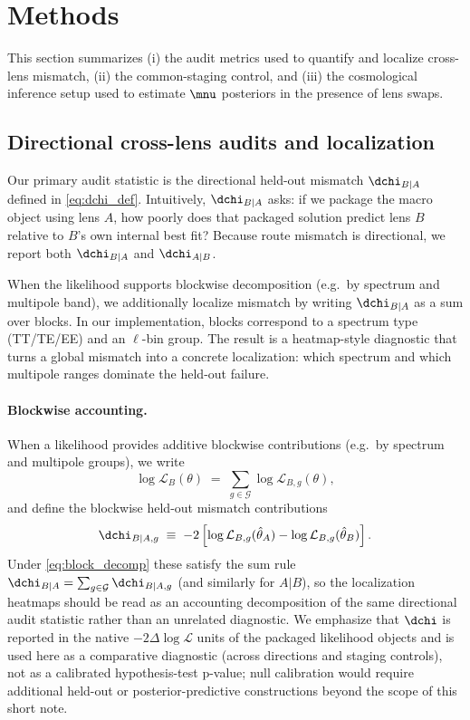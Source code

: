 \section{Methods}
\label{sec:methods}

This section summarizes (i) the audit metrics used to quantify and localize cross-lens mismatch, (ii) the common-staging control, and (iii) the cosmological inference setup used to estimate $\mnu$ posteriors in the presence of lens swaps.

\subsection{Directional cross-lens audits and localization}
\label{sec:audit-metrics}

Our primary audit statistic is the directional held-out mismatch $\dchi_{B|A}$ defined in \cref{eq:dchi_def}. Intuitively, $\dchi_{B|A}$ asks: if we package the macro object using lens $A$, how poorly does that packaged solution predict lens $B$ relative to $B$'s own internal best fit? Because route mismatch is directional, we report both $\dchi_{B|A}$ and $\dchi_{A|B}$.

When the likelihood supports blockwise decomposition (e.g.\ by spectrum and multipole band), we additionally localize mismatch by writing $\dchi_{B|A}$ as a sum over blocks. In our implementation, blocks correspond to a spectrum type (TT/TE/EE) and an $\ell$-bin group. The result is a heatmap-style diagnostic that turns a global mismatch into a concrete localization: which spectrum and which multipole ranges dominate the held-out failure.

\paragraph{Blockwise accounting.}
When a likelihood provides additive blockwise contributions (e.g.\ by spectrum and multipole groups), we write
\begin{equation}
  \log \mathcal{L}_B(\theta) \;=\; \sum_{g\in\mathcal{G}} \log \mathcal{L}_{B,g}(\theta),
  \label{eq:block_decomp}
\end{equation}
and define the blockwise held-out mismatch contributions
\begin{equation}
  \dchi_{B|A,g} \;\equiv\; -2\left[\log \mathcal{L}_{B,g}(\hat\theta_A) - \log \mathcal{L}_{B,g}(\hat\theta_B)\right].
  \label{eq:block_dchi}
\end{equation}
Under \cref{eq:block_decomp} these satisfy the sum rule $\dchi_{B|A}=\sum_{g\in\mathcal{G}}\dchi_{B|A,g}$ (and similarly for $A|B$), so the localization heatmaps should be read as an accounting decomposition of the same directional audit statistic rather than an unrelated diagnostic.
We emphasize that $\dchi$ is reported in the native $-2\Delta\log\mathcal{L}$ units of the packaged likelihood objects and is used here as a comparative diagnostic (across directions and staging controls), not as a calibrated hypothesis-test p-value; null calibration would require additional held-out or posterior-predictive constructions beyond the scope of this short note.

